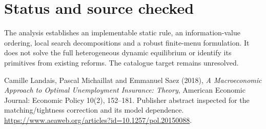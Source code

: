 \documentclass[11pt]{article}
\begin{document}
\section*{Status and source checked}
The analysis establishes an implementable static rule, an information-value ordering, local search decompositions and a robust finite-menu formulation. It does not solve the full heterogeneous dynamic equilibrium or identify its primitives from existing reforms. The catalogue target remains unresolved.

Camille Landais, Pascal Michaillat and Emmanuel Saez (2018), \emph{A Macroeconomic Approach to Optimal Unemployment Insurance: Theory}, American Economic Journal: Economic Policy 10(2), 152--181. Publisher abstract inspected for the matching/tightness correction and its model dependence. \url{https://www.aeaweb.org/articles?id=10.1257/pol.20150088}.
\end{document}
